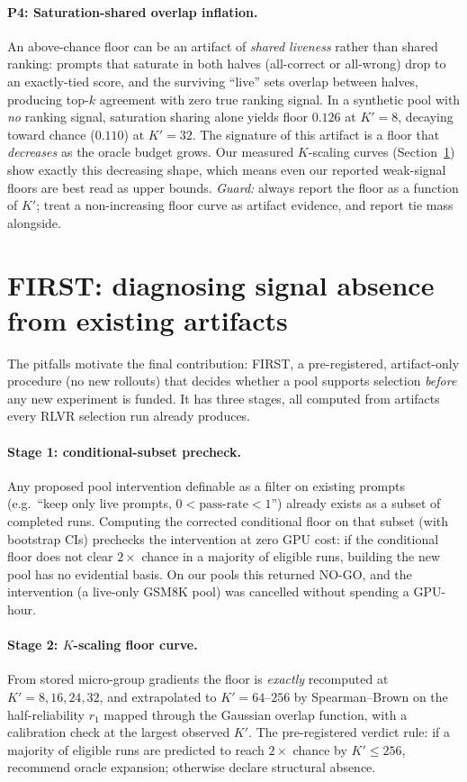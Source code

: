 \documentclass[11pt]{article}
\begin{document}
\paragraph{P4: Saturation-shared overlap inflation.} An above-chance floor can
be an artifact of \emph{shared liveness} rather than shared ranking: prompts
that saturate in both halves (all-correct or all-wrong) drop to an exactly-tied
score, and the surviving ``live'' sets overlap between halves, producing
top-$k$ agreement with zero true ranking signal. In a synthetic pool with
\emph{no} ranking signal, saturation sharing alone yields floor $0.126$ at
$K'{=}8$, decaying toward chance ($0.110$) at $K'{=}32$. The signature of
this artifact is a floor that \emph{decreases} as the oracle budget grows. Our measured $K$-scaling
curves (Section~\ref{sec:diagnosis}) show exactly this decreasing shape, which
means even our reported weak-signal floors are best read as upper bounds.
\emph{Guard:} always report the floor as a function of $K'$; treat a
non-increasing floor curve as artifact evidence, and report tie mass alongside.

\section{FIRST: diagnosing signal absence from existing artifacts}
\label{sec:diagnosis}

The pitfalls motivate the final contribution: FIRST, a pre-registered,
artifact-only procedure (no new rollouts) that decides whether a pool supports
selection \emph{before} any new experiment is funded. It has three stages, all
computed from artifacts every RLVR selection run already produces.

\paragraph{Stage 1: conditional-subset precheck.} Any proposed pool
intervention definable as a filter on existing prompts (e.g.\ ``keep only live
prompts, $0<\text{pass-rate}<1$'') already exists as a subset of completed
runs. Computing the corrected conditional floor on that subset (with bootstrap
CIs) prechecks the intervention at zero GPU cost: if the conditional floor does
not clear $2\times$ chance in a majority of eligible runs, building the new
pool has no evidential basis. On our pools this returned NO-GO, and the
intervention (a live-only GSM8K pool) was cancelled without spending a
GPU-hour.

\paragraph{Stage 2: $K$-scaling floor curve.} From stored micro-group
gradients the floor is \emph{exactly} recomputed at $K'{=}8,16,24,32$, and
extrapolated to $K'{=}64$--$256$ by Spearman--Brown on the half-reliability
$r_1$ mapped through the Gaussian overlap function, with a calibration check at
the largest observed $K'$. The pre-registered verdict rule: if a majority of
eligible runs are predicted to reach $2\times$ chance by $K'\le 256$,
recommend oracle expansion; otherwise declare structural absence.
\end{document}
